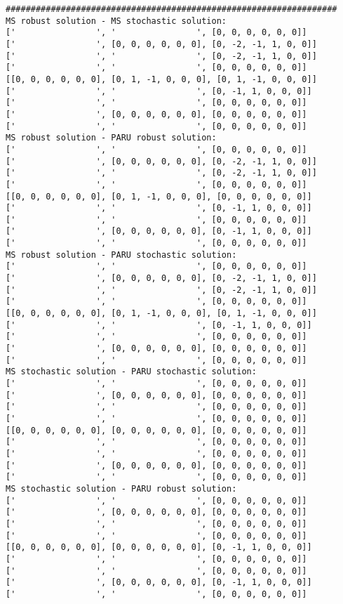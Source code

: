 \documentclass[10pt]{article}
\theoremstyle{plain}
\theoremstyle{definition}
\theoremstyle{remark}
\begin{document}
\begin{minipage}[t]{8cm}
\begin{verbatim}
##################################################################
MS robust solution - MS stochastic solution:
['                ', '                ', [0, 0, 0, 0, 0, 0]]
['                ', [0, 0, 0, 0, 0, 0], [0, -2, -1, 1, 0, 0]]
['                ', '                ', [0, -2, -1, 1, 0, 0]]
['                ', '                ', [0, 0, 0, 0, 0, 0]]
[[0, 0, 0, 0, 0, 0], [0, 1, -1, 0, 0, 0], [0, 1, -1, 0, 0, 0]]
['                ', '                ', [0, -1, 1, 0, 0, 0]]
['                ', '                ', [0, 0, 0, 0, 0, 0]]
['                ', [0, 0, 0, 0, 0, 0], [0, 0, 0, 0, 0, 0]]
['                ', '                ', [0, 0, 0, 0, 0, 0]]
MS robust solution - PARU robust solution:
['                ', '                ', [0, 0, 0, 0, 0, 0]]
['                ', [0, 0, 0, 0, 0, 0], [0, -2, -1, 1, 0, 0]]
['                ', '                ', [0, -2, -1, 1, 0, 0]]
['                ', '                ', [0, 0, 0, 0, 0, 0]]
[[0, 0, 0, 0, 0, 0], [0, 1, -1, 0, 0, 0], [0, 0, 0, 0, 0, 0]]
['                ', '                ', [0, -1, 1, 0, 0, 0]]
['                ', '                ', [0, 0, 0, 0, 0, 0]]
['                ', [0, 0, 0, 0, 0, 0], [0, -1, 1, 0, 0, 0]]
['                ', '                ', [0, 0, 0, 0, 0, 0]]
MS robust solution - PARU stochastic solution:
['                ', '                ', [0, 0, 0, 0, 0, 0]]
['                ', [0, 0, 0, 0, 0, 0], [0, -2, -1, 1, 0, 0]]
['                ', '                ', [0, -2, -1, 1, 0, 0]]
['                ', '                ', [0, 0, 0, 0, 0, 0]]
[[0, 0, 0, 0, 0, 0], [0, 1, -1, 0, 0, 0], [0, 1, -1, 0, 0, 0]]
['                ', '                ', [0, -1, 1, 0, 0, 0]]
['                ', '                ', [0, 0, 0, 0, 0, 0]]
['                ', [0, 0, 0, 0, 0, 0], [0, 0, 0, 0, 0, 0]]
['                ', '                ', [0, 0, 0, 0, 0, 0]]
MS stochastic solution - PARU stochastic solution:
['                ', '                ', [0, 0, 0, 0, 0, 0]]
['                ', [0, 0, 0, 0, 0, 0], [0, 0, 0, 0, 0, 0]]
['                ', '                ', [0, 0, 0, 0, 0, 0]]
['                ', '                ', [0, 0, 0, 0, 0, 0]]
[[0, 0, 0, 0, 0, 0], [0, 0, 0, 0, 0, 0], [0, 0, 0, 0, 0, 0]]
['                ', '                ', [0, 0, 0, 0, 0, 0]]
['                ', '                ', [0, 0, 0, 0, 0, 0]]
['                ', [0, 0, 0, 0, 0, 0], [0, 0, 0, 0, 0, 0]]
['                ', '                ', [0, 0, 0, 0, 0, 0]]
MS stochastic solution - PARU robust solution:
['                ', '                ', [0, 0, 0, 0, 0, 0]]
['                ', [0, 0, 0, 0, 0, 0], [0, 0, 0, 0, 0, 0]]
['                ', '                ', [0, 0, 0, 0, 0, 0]]
['                ', '                ', [0, 0, 0, 0, 0, 0]]
[[0, 0, 0, 0, 0, 0], [0, 0, 0, 0, 0, 0], [0, -1, 1, 0, 0, 0]]
['                ', '                ', [0, 0, 0, 0, 0, 0]]
['                ', '                ', [0, 0, 0, 0, 0, 0]]
['                ', [0, 0, 0, 0, 0, 0], [0, -1, 1, 0, 0, 0]]
['                ', '                ', [0, 0, 0, 0, 0, 0]]
\end{verbatim}
\end{minipage}
\end{document}
